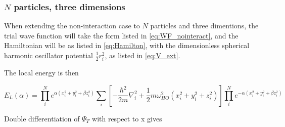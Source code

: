 \documentclass[norsk,a4paper,12pt]{article}
\begin{document}

\subsubsection{$N$ particles, three dimensions}

When extending the non-interaction case to $N$ particles and three dimentions, the trial wave function will take the form listed in \ref{eq:WF_nointeract}, and the Hamiltonian will be as listed in \ref{eq:Hamilton}, with the dimensionless spherical harmonic oscillator potential $\frac{1}{2}r_i^2$, as listed in \ref{eq:V_ext}.

\iffalse
The local energy is then

\begin{equation}
	E_L(\alpha) = \prod_i^N e^{\alpha(x_i^2 + y_i^2 + \beta z_i^2)} \sum_i [ -\frac{\hbar^2}{2m} \nabla_i^2 + \frac{1}{2}m\omega_{HO}^2(x_i^2 + y_i^2 + z_i^2)] \prod_i^N e^{-\alpha(x_i^2 + y_i^2 + \beta z_i^2)}
\end{equation}

Double differentiation of $\Psi_T$ with respect to x gives
\end{document}
